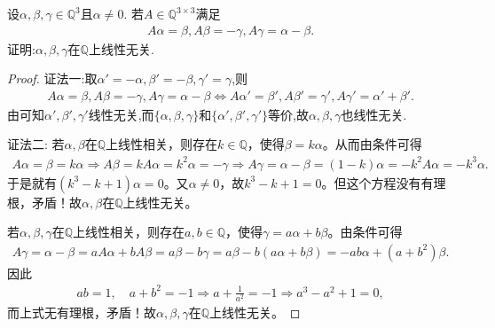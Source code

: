 \documentclass[../../main.tex]{subfiles}%
\begin{document}
\begin{example}\label{example:有理数域上线性变换与向量组线性无关的命题}
设$\alpha, \beta, \gamma \in \mathbb{Q}^3$且$\alpha \neq 0$. 若$A \in \mathbb{Q}^{3 \times 3}$满足
\begin{align*}
A\alpha =\beta ,A\beta =-\gamma ,A\gamma =\alpha -\beta .
\end{align*}
证明:$\alpha, \beta, \gamma$在$\mathbb{Q}$上线性无关.
\end{example}
\begin{proof}

{\color{blue}证法一:}取$\alpha'=-\alpha,\beta'=-\beta,\gamma'=\gamma$,则
\begin{align*}
A\alpha =\beta ,A\beta =-\gamma ,A\gamma =\alpha -\beta \Longleftrightarrow A\alpha' =\beta' ,A\beta' =\gamma' ,A\gamma' =\alpha' +\beta' .
\end{align*}
由可知$\alpha',\beta',\gamma'$线性无关,而$\{\alpha,\beta,\gamma\}$和$\{\alpha',\beta',\gamma'\}$等价,故$\alpha,\beta,\gamma$也线性无关.

{\color{blue}证法二:}
若$\alpha, \beta$在$\mathbb{Q}$上线性相关，则存在$k\in \mathbb{Q}$，使得$\beta =k\alpha$。从而由条件可得
\begin{align*}
A\alpha =\beta =k\alpha \Longrightarrow A\beta =kA\alpha =k^2\alpha =-\gamma 
\Longrightarrow A\gamma =\alpha -\beta =\left( 1-k \right) \alpha =-k^2A\alpha =-k^3\alpha .
\end{align*}
于是就有$\left( k^3-k+1 \right) \alpha =0$。又$\alpha \ne 0$，故$k^3-k+1=0$。但这个方程没有有理根，矛盾！故$\alpha, \beta$在$\mathbb{Q}$上线性无关。

若$\alpha, \beta, \gamma$在$\mathbb{Q}$上线性相关，则存在$a,b\in \mathbb{Q}$，使得$\gamma =a\alpha +b\beta$。由条件可得
\begin{align*}
A\gamma =\alpha -\beta =aA\alpha +bA\beta =a\beta -b\gamma =a\beta -b\left( a\alpha +b\beta \right) =-ab\alpha +\left( a+b^2 \right) \beta .
\end{align*}
因此
\begin{align*}
ab=1,\quad a+b^2=-1\Longrightarrow a+\frac{1}{a^2}=-1\Longrightarrow a^3-a^2+1=0,
\end{align*}
而上式无有理根，矛盾！故$\alpha, \beta, \gamma$在$\mathbb{Q}$上线性无关。


\end{proof}
\end{document}
